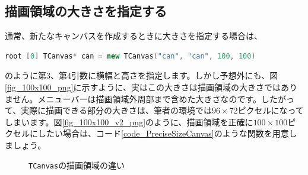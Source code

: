\subsection{描画領域の大きさを指定する}
通常、新たなキャンバスを作成するときに大きさを指定する場合は、
\begin{lstlisting}[language=C++]
root [0] TCanvas* can = new TCanvas("can", "can", 100, 100)
\end{lstlisting}
のように第3、第4引数に横幅と高さを指定します。しかし予想外にも、図\ref{fig_100x100_png}に示すように、実はこの大きさは描画領域の大きさではありません。メニューバーは描画領域外周部まで含めた大きさなのです。したがって、実際に描画できる部分の大きさは、筆者の環境では$96\times72$ピクセルになってしまいます。図\ref{fig_100x100_v2_png}のように、描画領域を正確に$100\times100$ピクセルにしたい場合は、コード\ref{code_PreciseSizeCanvas}のような関数を用意しましょう。

\begin{figure}
  \begin{center}
    \hfil
    \caption{\texttt{TCanvas}の描画領域の違い}
  \end{center}
\end{figure}

\begin{NoFloat}

\end{NoFloat}

